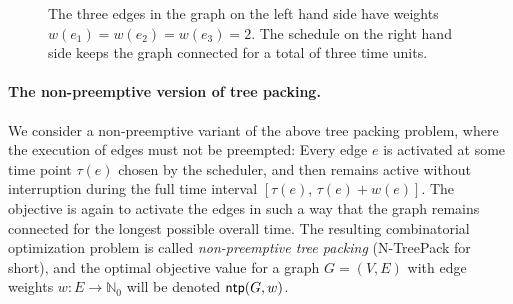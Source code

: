 \documentclass[runningheads]{llncs}
\newcommand{\NN}{\mathbb{N}}
\newcommand{\xxxNTP}{{\sc N-TreePack}}
\DeclareMathOperator{\ntp}{\text{\sf ntp}}
\begin{document}
\begin{figure}[tbh]
\begin{center}
\qquad\qquad
\end{center}
\caption{The three edges in the graph on the left hand side have weights $w(e_1)=w(e_2)=w(e_3)=2$.
The schedule on the right hand side keeps the graph connected for a total of three time units.}
\label{fig:example}

\vspace{-0.8cm}
\end{figure}

\paragraph{The non-preemptive version of tree packing.}
We consider a non-preemptive variant of the above tree packing problem,
where the execution of edges must not be preempted: 
Every edge $e$ is activated at some time point $\tau(e)$ chosen by the scheduler, and then 
remains active without interruption during the full time interval $[\tau(e),\,\tau(e)+w(e)]$.
The objective is again to activate the edges in such a way that the graph
remains connected for the longest possible overall time.
The resulting combinatorial optimization problem is called \emph{non-preemptive tree packing}
({\xxxNTP} for short), and the optimal objective value for a graph $G=(V,E)$ with edge 
weights $w:E\to\NN_0$ will be denoted $\ntp(G,w)$.
\end{document}
